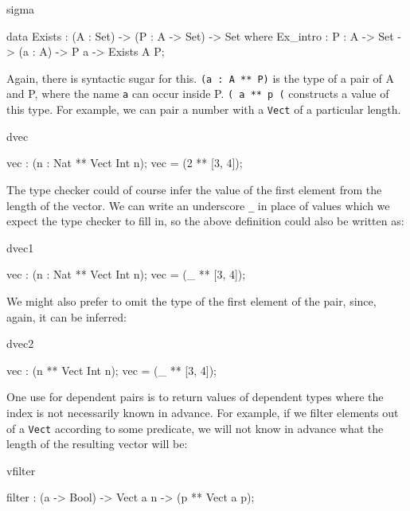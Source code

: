 \begin{SaveVerbatim}{sigma}

data Exists : (A : Set) -> (P : A -> Set) -> Set where
   Ex_intro : {P : A -> Set} -> (a : A) -> P a -> Exists A P;

\end{SaveVerbatim}

Again, there is syntactic sugar for this. \texttt{(a : A ** P)} is the type of a pair of
A and P, where the name \texttt{a} can occur inside P. \texttt{( a ** p (} 
constructs a value of this type. For example, we can pair a number with a 
\texttt{Vect} of a particular length.

\begin{SaveVerbatim}{dvec}

vec : (n : Nat ** Vect Int n);
vec = (2 ** [3, 4]);

\end{SaveVerbatim}

\noindent
The type checker could of course infer the value of the first element from the
length of the vector. We can write an underscore \texttt{\_} in place of values which we
expect the type checker to fill in, so the above definition could also be
written as:

\begin{SaveVerbatim}{dvec1}

vec : (n : Nat ** Vect Int n);
vec = (_ ** [3, 4]);

\end{SaveVerbatim}

\noindent
We might also prefer to omit the type of the first element of the pair, since,
again, it can be inferred:

\begin{SaveVerbatim}{dvec2}

vec : (n ** Vect Int n);
vec = (_ ** [3, 4]);

\end{SaveVerbatim}

One use for dependent pairs is to return values of dependent types where the
index is not necessarily known in advance. For example, if we filter elements
out of a \texttt{Vect} according to some predicate, we will not know in advance what the
length of the resulting vector will be:

\begin{SaveVerbatim}{vfilter}

filter : (a -> Bool) -> Vect a n -> (p ** Vect a p);

\end{SaveVerbatim}

